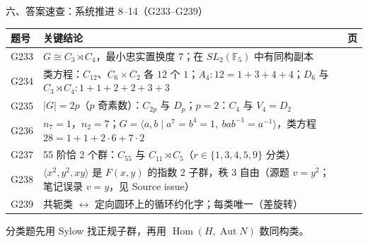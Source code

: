 \documentclass[aspectratio=169,10pt,fontset=none]{ctexbeamer}
\begin{document}
\begin{frame}[t]{六、答案速查：系统推进 8--14（G233--G239）}
  \centering
  \scriptsize
  \setlength{\tabcolsep}{3pt}
  \renewcommand{\arraystretch}{1.22}
  \begin{tabular}{@{}l p{10.0cm} c@{}}
    \toprule
    题号 & 关键结论 & 页\\
    \midrule
    G233 & $G\cong C_3\rtimes C_4$，最小忠实置换度 $7$；在 $SL_2(\mathbb F_5)$ 中有同构副本 & \pageref{ex:G233}\\
    G234 & 类方程：$C_{12}$、$C_6\times C_2$ 各 $12$ 个 $1$；$A_4:12=1+3+4+4$；$D_6$ 与 $C_3\rtimes C_4:1+1+2+2+3+3$ & \pageref{ex:G234}\\
    G235 & $|G|=2p$（$p$ 奇素数）：$C_{2p}$ 与 $D_p$；$p=2$：$C_4$ 与 $V_4=D_2$ & \pageref{ex:G235}\\
    G236 & $n_7=1$，$n_2=7$；$G=\langle a,b\mid a^7=b^4=1,\ bab^{-1}=a^{-1}\rangle$，类方程 $28=1+1+2\cdot6+7\cdot2$ & \pageref{ex:G236}\\
    G237 & 55 阶恰 $2$ 个群：$C_{55}$ 与 $C_{11}\rtimes C_5$（$r\in\{1,3,4,5,9\}$ 分类） & \pageref{ex:G237}\\
    G238 & $\langle x^2,y^2,xy\rangle$ 是 $F(x,y)$ 的指数 $2$ 子群，秩 $3$ 自由（源题 $v=y^2$；笔记误录 $v=y$，见 Source issue） & \pageref{ex:G238}\\
    G239 & 共轭类 $\leftrightarrow$ 定向圆环上的循环约化字；每类唯一（差旋转） & \pageref{ex:G239}\\
    \bottomrule
  \end{tabular}
  \par
  \vspace{0.3em}
  {\scriptsize\color{ink!70} 分类题先用 Sylow 找正规子群，再用 $\operatorname{Hom}(H,\operatorname{Aut}N)$ 数同构类。}
\end{frame}
\end{document}
